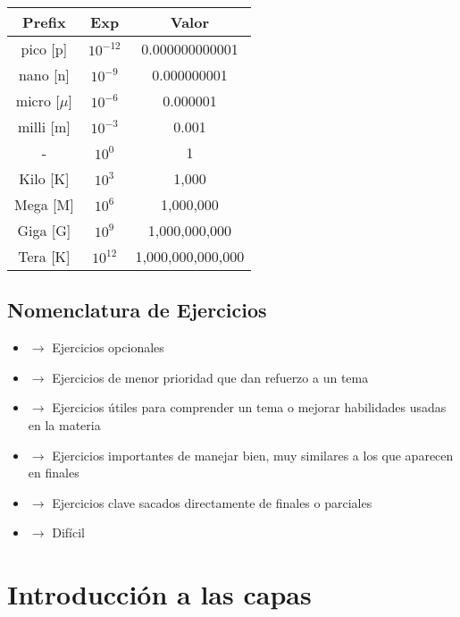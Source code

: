 \documentclass[12pt]{report}
\begin{document}
\begin{center}
\begin{tabular}{|| c | c | c ||} 
 \hline
 Prefix & Exp & Valor \\ [0.2ex] 
 \hline\hline
 pico [p] & $10^{-12}$ & 0.000000000001 \\ 
 \hline
 nano [n] & $10^{-9}$ & 0.000000001 \\
 \hline
 micro [$\mu$] & $10^{-6}$ & 0.000001 \\
 \hline
  milli [m] & $10^{-3}$ & 0.001 \\
 \hline
 - & $10^{0}$ & 1 \\
 \hline
 Kilo  [K] & $10^{3}$ & 1,000 \\
  \hline
 Mega  [M] & $10^{6}$ & 1,000,000 \\
  \hline
 Giga [G] & $10^{9}$ & 1,000,000,000 \\
  \hline
 Tera  [K] & $10^{12}$ & 1,000,000,000,000 \\
 \hline
\end{tabular}
\end{center}

\section{Nomenclatura de Ejercicios}

\begin{itemize}
	\item \bb{\sone} $\rightarrow$ Ejercicios opcionales
	\item \bb{\stwo} $\rightarrow$ Ejercicios de menor prioridad que dan refuerzo a un tema
	\item \bb{\sthree} $\rightarrow$ Ejercicios útiles para comprender un tema o mejorar habilidades usadas en la materia
	\item \bb{\sfour} $\rightarrow$ Ejercicios importantes de manejar bien, muy similares a los que aparecen en finales
	\item \bb{\sfive} $\rightarrow$ Ejercicios clave sacados directamente de finales o parciales
	\item \bb{\shard} $\rightarrow$ Difícil
\end{itemize}

%
%


\chapter{Introducción a las capas}
\end{document}
